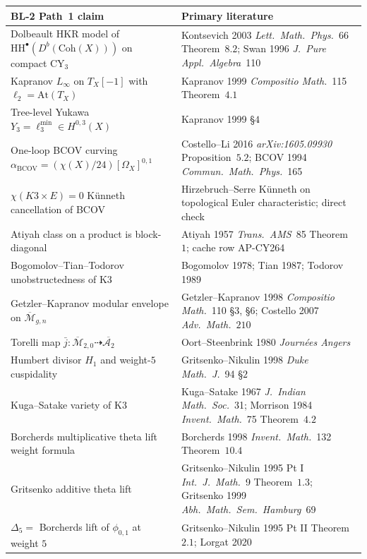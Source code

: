 \documentclass[11pt]{article}
\providecommand{\At}{\mathrm{At}}
\providecommand{\BCOV}{\mathrm{BCOV}}
\providecommand{\HH}{\mathrm{HH}}
\providecommand{\Coh}{\mathrm{Coh}}
\providecommand{\Om}{\Omega}
\providecommand{\cA}{\mathcal{A}}
\providecommand{\Mbar}{\overline{\mathcal M}}
\begin{document}
\begin{center}
\small
\renewcommand{\arraystretch}{1.25}
\begin{tabular}{p{}p{}}
\textbf{BL-2 Path~1 claim} & \textbf{Primary literature} \\
\hline
Dolbeault HKR model of $\HH^\bullet(D^b(\Coh(X)))$ on compact CY$_3$ &
Kontsevich 2003 \emph{Lett.\ Math.\ Phys.}~66 Theorem~$8.2$;
Swan 1996 \emph{J.\ Pure Appl.\ Algebra}~110 \\
Kapranov $L_\infty$ on $T_X[-1]$ with $\ell_2 = \At(T_X)$ &
Kapranov 1999 \emph{Compositio Math.}~115 Theorem~$4.1$ \\
Tree-level Yukawa $Y_3 = \ell_3^{\min} \in H^{0, 3}(X)$ &
Kapranov 1999 \S$4$ \\
One-loop BCOV curving $\alpha_\BCOV = (\chi(X)/24)[\Om_X]^{0, 1}$ &
Costello--Li 2016 \emph{arXiv:1605.09930} Proposition~$5.2$;
BCOV 1994 \emph{Commun.\ Math.\ Phys.}~165 \\
$\chi(K3 \times E) = 0$ K\"unneth cancellation of BCOV &
Hirzebruch--Serre K\"unneth on topological Euler characteristic; direct check \\
Atiyah class on a product is block-diagonal &
Atiyah 1957 \emph{Trans.\ AMS}~85 Theorem~$1$; cache row AP-CY264 \\
Bogomolov--Tian--Todorov unobstructedness of K3 &
Bogomolov 1978; Tian 1987; Todorov 1989 \\
Getzler--Kapranov modular envelope on $\Mbar_{g, n}$ &
Getzler--Kapranov 1998 \emph{Compositio Math.}~110 \S$3$, \S$6$;
Costello 2007 \emph{Adv.\ Math.}~$210$ \\
Torelli map $\bar j \colon \Mbar_{2, 0} \dashrightarrow \overline{\cA_2}$ &
Oort--Steenbrink 1980 \emph{Journ\'ees Angers} \\
Humbert divisor $H_1$ and weight-$5$ cuspidality &
Gritsenko--Nikulin 1998 \emph{Duke Math.\ J.}~94 \S$2$ \\
Kuga--Satake variety of K3 &
Kuga--Satake 1967 \emph{J.\ Indian Math.\ Soc.}~31;
Morrison 1984 \emph{Invent.\ Math.}~75 Theorem~$4.2$ \\
Borcherds multiplicative theta lift weight formula &
Borcherds 1998 \emph{Invent.\ Math.}~132 Theorem~$10.4$ \\
Gritsenko additive theta lift &
Gritsenko--Nikulin 1995 Pt I \emph{Int.\ J.\ Math.}~9 Theorem~$1.3$;
Gritsenko 1999 \emph{Abh.\ Math.\ Sem.\ Hamburg}~69 \\
$\Delta_5 = $ Borcherds lift of $\phi_{0, 1}$ at weight $5$ &
Gritsenko--Nikulin 1995 Pt II Theorem~$2.1$; Lorgat 2020 \\

\end{tabular}
\end{center}
\end{document}
